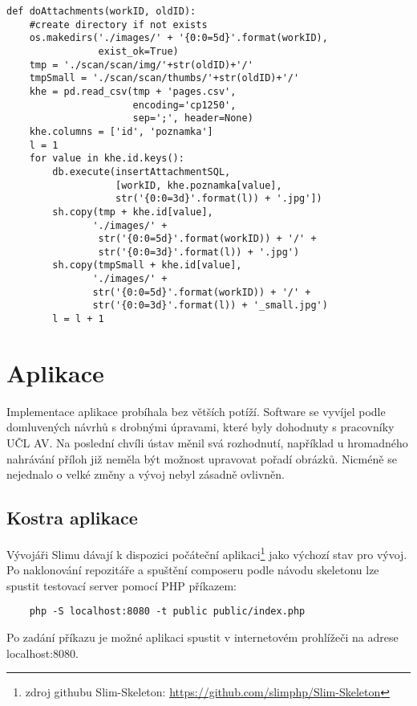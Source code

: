 \pagebreak
            \begin{verbatim}
def doAttachments(workID, oldID):
    #create directory if not exists
    os.makedirs('./images/' + '{0:0=5d}'.format(workID),
                exist_ok=True)
    tmp = './scan/scan/img/'+str(oldID)+'/'
    tmpSmall = './scan/scan/thumbs/'+str(oldID)+'/'
    khe = pd.read_csv(tmp + 'pages.csv',
                      encoding='cp1250',
                      sep=';', header=None)
    khe.columns = ['id', 'poznamka']
    l = 1
    for value in khe.id.keys():
        db.execute(insertAttachmentSQL,
                   [workID, khe.poznamka[value],
                   str('{0:0=3d}'.format(l)) + '.jpg'])
        sh.copy(tmp + khe.id[value], 
               './images/' + 
                str('{0:0=5d}'.format(workID)) + '/' +
                str('{0:0=3d}'.format(l)) + '.jpg')
        sh.copy(tmpSmall + khe.id[value], 
               './images/' + 
               str('{0:0=5d}'.format(workID)) + '/' +
               str('{0:0=3d}'.format(l)) + '_small.jpg')
        l = l + 1
            \end{verbatim}

            
            
    \section{Aplikace}
    
        Implementace aplikace probíhala bez větších potíží. Software se vyvíjel podle domluvených návrhů s drobnými úpravami, které byly dohodnuty s pracovníky UČL AV. Na poslední chvíli ústav měnil svá rozhodnutí, například u hromadného nahrávání příloh již neměla být možnost upravovat pořadí obrázků. Nicméně se nejednalo o velké změny a vývoj nebyl zásadně ovlivněn.
        \subsection{Kostra aplikace}
            Vývojáři Slimu dávají k dispozici počáteční aplikaci\footnote{zdroj githubu Slim-Skeleton: \url{https://github.com/slimphp/Slim-Skeleton}} jako výchozí stav pro vývoj. Po naklonování repozitáře a spuštění composeru podle návodu skeletonu lze spustit testovací server pomocí PHP příkazem:
            \begin{lstlisting}
    php -S localhost:8080 -t public public/index.php
            \end{lstlisting}
            Po zadání příkazu je možné aplikaci spustit v internetovém prohlížeči na adrese localhost:8080.
            
